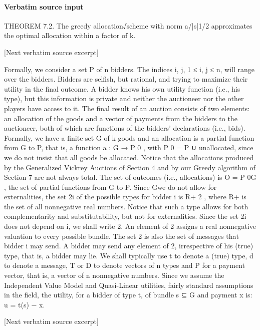 \documentclass[10pt]{article}
\begin{document}
\paragraph{Verbatim source input}
\begin{ReviewVerbatim}
THEOREM 7.2. The greedy allocation√scheme with norm a/|s|1/2 approximates
the optimal allocation within a factor of k.

[Next verbatim source excerpt]

Formally, we consider a set P of n bidders. The indices i, j, 1 ≤ i, j ≤ n, will
range over the bidders. Bidders are selfish, but rational, and trying to maximize their
utility in the final outcome. A bidder knows his own utility function (i.e., his type),
but this information is private and neither the auctioneer nor the other players have
access to it. The final result of an auction consists of two elements: an allocation
of the goods and a vector of payments from the bidders to the auctioneer, both of
which are functions of the bidders’ declarations (i.e., bids). Formally, we have a
finite set G of k goods and an allocation is a partial function from G to P, that is, a
function a : G → P 0 , with P 0 = P ∪ {unallocated}, since we do not insist that all
goods be allocated. Notice that the allocations produced by the Generalized Vickrey
Auctions of Section 4 and by our Greedy algorithm of Section 7 are not always
total. The set of outcomes (i.e., allocations) is O = P 0G , the set of partial functions
from G to P. Since Gwe do not allow for externalities, the set 2i of the possible types
for bidder i is R+ 2 , where R+ is the set of all nonnegative real numbers. Notice
that such a type allows for both complementarity and substitutability, but not for
externalities. Since the set 2i does not depend on i, we shall write 2. An element
of 2 assigns a real nonnegative valuation to every possible bundle. The set 2 is
also the set of messages that bidder i may send. A bidder may send any element of
2, irrespective of his (true) type, that is, a bidder may lie. We shall typically use t
to denote a (true) type, d to denote a message, T or D to denote vectors of n types
and P for a payment vector, that is, a vector of n nonnegative numbers.
Since we assume the Independent Value Model and Quasi-Linear utilities, fairly
standard assumptions in the field, the utility, for a bidder of type t, of bundle s ⊆ G
and payment x is:
u = t(s) − x.

[Next verbatim source excerpt]


\end{ReviewVerbatim}
\end{document}
